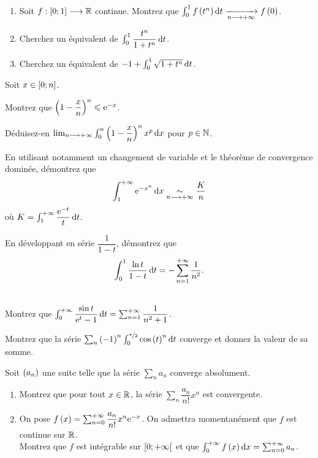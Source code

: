 \begin{exoss}
\begin{enumerate}
    \item Soit \(f:\left[0;1\right]\longrightarrow\mathbb{R}\) continue. Montrez que \(\int_0^1f\paren{t^n}\odif{t}\tendqd{n\to\pinf}f\paren{0}\). \\
    \item Cherchez un équivalent de \(\int_0^1\dfrac{t^n}{1+t^n}\odif{t}\). \\
    \item Cherchez un équivalent de \(-1+\int_0^1\sqrt{1+t^n}\odif{t}\).
\end{enumerate}
\end{exoss}

\begin{exoss}
Soit \(x\in\left[0;n\right]\).

Montrez que \(\left(1-\dfrac{x}{n}\right)^n\leqslant\mathrm{e}^{-x}\).

Déduisez-en \(\lim_{n\to\pinf}\int_0^n\paren{1-\dfrac{x}{n}}^nx^p\odif{x}\) pour \(p\in\mathbb{N}\).
\end{exoss}

\begin{exoss}
En utilisant notamment un changement de variable et le théorème de convergence dominée, démontrez que \[\int_1^{\pinf}\e{-x^n}\odif{x}\simqd{n\to\pinf}\dfrac{K}{n}\] où \(K=\int_1^{\pinf}\dfrac{\e{-t}}{t}\odif{t}\).
\end{exoss}

\begin{exos}
En développant en série \(\dfrac{1}{1-t}\), démontrez que \[\int_0^1\dfrac{\ln t}{1-t}\odif{t}=-\sum_{n=1}^{\pinf}\dfrac{1}{n^2}.\]
\end{exos}

\begin{exoss}~\\
Montrez que \(\int_0^{\pinf}\dfrac{\sin t}{\e{t}-1}\odif{t}=\sum_{n=1}^{\pinf}\dfrac{1}{n^2+1}\).
\end{exoss}

\begin{exoss}
Montrez que la série \(\sum_n\paren{-1}^n\int_0^{\nicefrac{\pi}{2}}\cos\paren{t}^n\odif{t}\) converge et donnez la valeur de sa somme.
\end{exoss}

\begin{exoss}
Soit \(\left(a_n\right)\) une suite telle que la série \(\sum_na_n\) converge absolument.

\begin{enumerate}
    \item Montrez que pour tout \(x\in\mathbb{R}\), la série \(\sum_n\dfrac{a_n}{n!}x^n\) est convergente. \\
    \item On pose \(f\left(x\right)=\sum_{n=0}^{+\infty}\dfrac{a_n}{n!}x^n\mathrm{e}^{-x}\). On admettra momentanément que \(f\) est continue sur \(\mathbb{R}\). \\ Montrez que \(f\) est intégrable sur \(\left[0;+\infty\right[\) et que \(\int_0^{\pinf}f\paren{x}\odif{x}=\sum_{n=0}^{\pinf}a_n\).
\end{enumerate}
\end{exoss}

